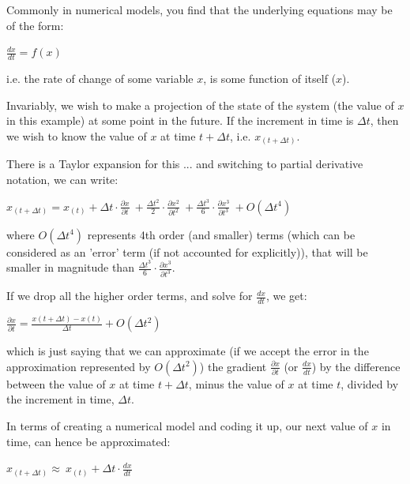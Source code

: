 \documentclass{tufte-book} %
\begin{document}
\noindent Commonly in numerical models, you find that the underlying equations may be of the form:

\vspace{2mm}
\(\frac{dx}{dt}=f(x)\)
\vspace{2mm}

\noindent i.e. the rate of change of some variable \(x\), is some function of itself (\(x\)).

Invariably, we wish to make a projection of the state of the system (the value of \(x\) in this example) at some point in the future. If the increment in time is \(\Delta t\), then we wish to know the value of \(x\) at time \(t+\Delta t\), i.e. \(x_{(t+\Delta t)}\).

There is a Taylor expansion for this ... and switching to partial derivative notation, we can write:

\vspace{2mm}\(
x_{(t+\Delta t)}=x_{(t)} + \Delta t\cdot\frac{\partial x}{\partial t}\ + \frac{\Delta t^{2}}{2}\cdot\frac{\partial x^{2}}{\partial t^{2}}\ + \frac{\Delta t^{3}}{6}\cdot\frac{\partial x^{3}}{\partial t^{3}}\ + O(\Delta t^{4})
\)\vspace{2mm}

\noindent where \(O(\Delta t^{4})\) represents 4th order (and smaller) terms (which can be considered as an 'error' term (if not accounted for explicitly)), that will be smaller in magnitude than \(\frac{\Delta t^{3}}{6}\cdot\frac{\partial x^{3}}{\partial t^{3}}\).

If we drop all the higher order terms, and solve for \(\frac{dx}{dt}\), we get:

\vspace{2mm}\(
\frac{\partial x}{\partial t} = \frac{x(t+\Delta t)-x(t)}{\Delta t} + O(\Delta t^{2})
\)\vspace{2mm}

\noindent which is just saying that we can approximate (if we accept the error in the approximation represented by \( O(\Delta t^{2})\)) the gradient \(\frac{\partial x}{\partial t}\) (or \(\frac{dx}{dt}\)) by the difference between the value of \(x\) at time \(t+\Delta t\), minus the value of \(x\) at time \(t\), divided by the increment in time, \(\Delta t\).

In terms of creating a numerical model and coding it up, our next value of \(x\) in time, can hence be approximated:

\vspace{2mm}\(
x_{(t+\Delta t)} \approx\ x_{(t)} + \Delta t\cdot\frac{dx}{dt}
\)\vspace{2mm}
\end{document}
